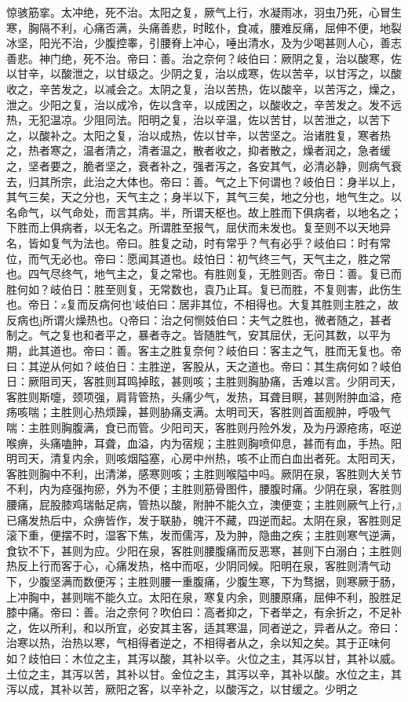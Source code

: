 \documentclass[a4paper,12pt,UTF8,twoside]{ctexbook}
\begin{document}
惊骇筋挛。太冲绝，死不治。太阳之复，厥气上行，水凝雨冰，羽虫乃死，心冒生寒，胸隔不利，心痛否满，头痛善悲，时眩仆，食减，腰难反痛，屈伸不便，地裂冰坚，阳光不治，少腹控睾，引腰脊上冲心，唾出清水，及为少喝甚则人心，善志善悲。神门绝，死不治。帝曰：善。治之奈何？岐伯曰：厥阴之复，治以酸寒，佐以甘辛，以酸泄之，以甘级之。少阴之复，治以成寒，佐以苦辛，以甘泻之，以酸收之，辛苦发之，以减会之。太阴之复，治以苦热，佐以酸辛，以苦泻之，燥之，泄之。少阳之复，治以成冷，佐以含辛，以成困之，以酸收之，辛苦发之。发不远热，无犯温凉。少阻同法。阳明之复，治以辛温，佐以苦甘，以苦泄之，以苦下之，以酸补之。太阳之复，治以成热，佐以甘辛，以苦坚之。治诸胜复，寒者热之，热者寒之，温者清之，清者温之，散者收之，抑者散之，燥者润之，急者缓之，坚者要之，脆者坚之，衰者补之，强者泻之，各安其气，必清必静，则病气衰去，归其所宗，此治之大体也。帝曰：善。气之上下何谓也？岐伯日：身半以上，其气三矣，天之分也，天气主之；身半以下，其气三矣，地之分也，地气生之。以名命气，以气命处，而言其病。半，所谓天枢也。故上胜而下俱病者，以地名之；下胜而上俱病者，以无名之。所谓胜至报气，屈伏而未发也。复至则不以天地异名，皆如复气为法也。帝曰。胜复之动，时有常乎？气有必乎？岐伯曰：时有常位，而气无必也。帝曰：愿闻其道也。歧怕日：初气终三气，天气主之，胜之常也。四气尽终气，地气主之，复之常也。有胜则复，无胜则否。帝日：善。复已而胜何如？岐伯日：胜至则复，无常数也，袁乃止耳。复已而胜，不复则害，此伤生也。帝日：z复而反病何也’岐伯曰：居非其位，不相得也。大复其胜则主胜之，故反病也j所谓火燥热也。Q帝曰：治之何恻妓伯曰：夫气之胜也，微者随之，甚者制之。气之复也和者平之，暴者寺之。皆随胜气，安其屈伏，无问其数，以平为期，此其道也。帝曰：善。客主之胜复奈何？岐伯曰：客主之气，胜而无复也。帝曰：其逆从何如？岐伯日：主胜逆，客股从，天之道也。帝曰：其生病何如？岐伯日：厥阻司天，客胜则耳鸣掉眩，甚则咳；主胜则胸胁痛，舌难以言。少阴司天，客胜则斯嚏，颈项强，肩背管热，头痛少气，发热，耳聋目瞑，甚则附肿血溢，疮疡咳喘；主胜则心热烦躁，甚则胁痛支满。太明司天，客胜则首面舰肿，呼吸气喘：主胜则胸腹满，食已而管。少阳司天，客胜则丹险外发，及为丹源疮疡，呕逆喉痹，头痛嗑肿，耳聋，血溢，内为宿规；主胜则胸喷仰息，甚而有血，手热。阳明司天，清复内余，则咳烟隘塞，心房中州热，咳不止而白血出者死。太阳司天，客胜则胸中不利，出清涕，感寒则咳；主胜则喉隘中吗。厥阴在泉，客胜则大关节不利，内为痉强拘瘀，外为不便；主胜则筋骨图件，腰腹时痛。少阴在泉，客胜则腰痛，屁股膝鸡瑞骷足病，管热以酸，附肿不能久立，澳便变；主胜则厥气上行，』已痛发热后中，众痹皆作，发于联胁，魄汗不藏，四逆而起。太阴在泉，客胜则足滚下重，便摆不时，湿客下焦，发而儒泻，及为肿，隐曲之疾；主胜则寒气逆满，食钦不下，甚则为应。少阳在泉，客胜则腰腹痛而反恶寒，甚则下白溺白；主胜则热反上行而客于心，心痛发热，格中而呕，少阴同候。阳明在泉，客胜则清气动下，少腹坚满而数便泻；主胜则腰一重腹痛，少腹生寒，下为骛据，则寒厥于肠，上冲胸中，甚则喘不能久立。太阳在泉，寒复内余，则腰原痛，屈伸不利，股胜足膝中痛。帝曰：善。治之奈何？吹伯曰：高者抑之，下者举之，有余折之，不足补之，佐以所利，和以所宜，必安其主客，适其寒温，同者逆之，异者从之。帝曰：治寒以热，治热以寒，气相得者逆之，不相得者从之，余以知之矣。其于正味何如？歧怕曰：木位之主，其泻以酸，其补以辛。火位之主，其泻以甘，其补以威。土位之主，其泻以苦，其补以甘。金位之主，其泻以辛，其补以酸。水位之主，其泻以成，其补以苦，厥阳之客，以辛补之，以酸泻之，以甘缓之。少明之
\end{document}
